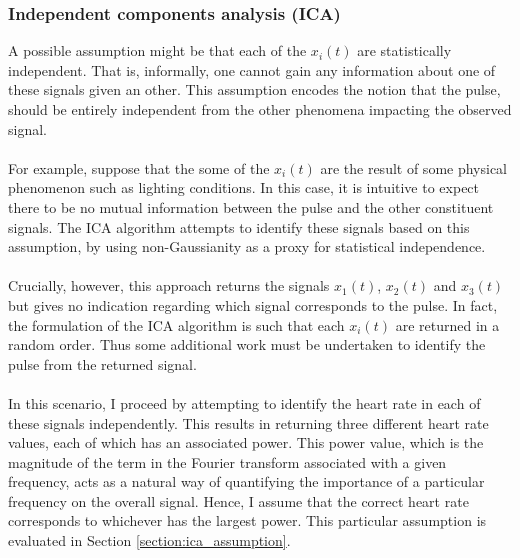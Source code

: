 \subsubsection{Independent components analysis (ICA)}
A possible assumption might be that each of the $x_i(t)$ are statistically independent. That is, informally, one cannot gain any information about one of these signals given an other. This assumption encodes the notion that the pulse, should be entirely independent from the other phenomena impacting the observed signal.
\\\\
For example, suppose that the some of the $x_i(t)$ are the result of some physical phenomenon such as lighting conditions. In this case, it is intuitive to expect there to be no mutual information between the pulse and the other constituent signals. The ICA algorithm attempts to identify these signals based on this assumption, by using non-Gaussianity as a proxy for statistical independence.
\\\\
Crucially, however, this approach returns the signals $x_1(t)$, $x_2(t)$ and $x_3(t)$ but gives no indication regarding which signal corresponds to the pulse. In fact, the formulation of the ICA algorithm is such that each $x_i(t)$ are returned in a random order. Thus some additional work must be undertaken to identify the pulse from the returned signal. 
\\\\
In this scenario, I proceed by attempting to identify the heart rate in each of these signals independently. This results in returning three different heart rate values, each of which has an associated power.
This power value, which is the magnitude of the term in the Fourier transform associated with a given frequency, acts as a natural way of quantifying the importance of a particular frequency on the overall signal.
Hence, I assume that the correct heart rate corresponds to whichever has the largest power. This particular assumption is evaluated in Section \ref{section:ica_assumption}.

